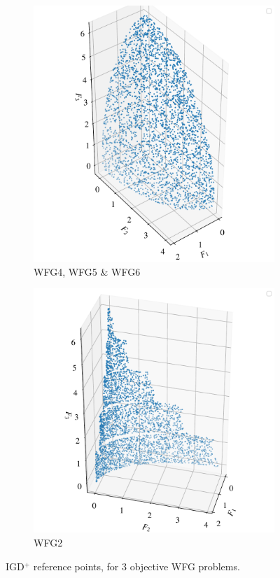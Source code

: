 \documentclass[conference]{IEEEtran}
\newcommand\igd{IGD$^+$\xspace}
\begin{document}
\begin{figure}[t]
\begin{subfigure}[t]{0.45\columnwidth}
    \includegraphics[width=\columnwidth]{figures/_IGD_refpoint_example_WFG4.pdf}
    \caption{WFG4, WFG5 \& WFG6}
    \label{fig: refpoints_wfg4}
\end{subfigure}
\begin{subfigure}[t]{0.45\columnwidth}
    \includegraphics[width=\columnwidth]{figures/_IGD_refpoint_example_WFG2.pdf}
    \caption{WFG2}
    \label{fig: refpoints_wfg2}
\end{subfigure}
\caption{\igd reference points, for 3 objective WFG problems.}

\end{figure}
\end{document}
